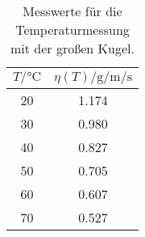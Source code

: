 \begin{table}[h]
  \centering
  \caption{Messwerte für die Temperaturmessung mit der großen Kugel.}
  \label{tab:Viskovgl}
  \begin{tabular}{c c}
    \toprule
    $T/\si{\celsius}$ & $\eta(T)/\si{\gram\per\meter\per\second}$ \\
    \midrule
    20 & 1.174 \\
    30 & 0.980 \\
    40 & 0.827 \\
    50 & 0.705 \\
    60 & 0.607 \\
    70 & 0.527 \\
    \bottomrule
  \end{tabular}
\end{table}
